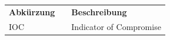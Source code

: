 
\section*{\sectionname}
\begin{flushleft}
    \begin{tabular}{p{3cm}p{1cm}p{10cm}}
        \bfseries Abkürzung & & \bfseries Beschreibung\\[0.5cm]
        IOC && Indicator of Compromise\\

    \end{tabular}
\end{flushleft}

